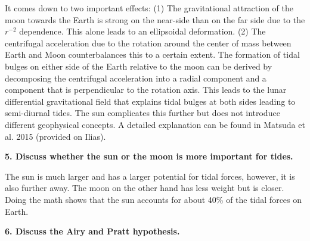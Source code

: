 \documentclass[a4paper,12pt]{article}
\newif\ifanswers
\begin{document}
    \begin{tcolorbox}[enhanced jigsaw,breakable,pad at break*=1mm,
      colback=blue!5!white,colframe=babyblueeyes,title=Solutions]
    It comes down to two important effects: (1) The gravitational attraction of the moon towards the Earth is strong on the near-side than on the far side due to the $r^{-2}$ dependence. This alone leads to an ellipsoidal deformation. (2) The centrifugal acceleration due to the rotation around the center of mass between Earth and Moon counterbalances this to a certain extent. The formation of tidal bulges on either side of the Earth relative to the moon can be derived by decomposing the centrifugal acceleration into a radial component and a component that is perpendicular to the rotation axis. This leads to the lunar differential gravitational field that explains tidal bulges at both sides leading to semi-diurnal tides. The sun complicates this further but does not introduce different geophysical concepts. A detailed explanation can be found in Matsuda et al. 2015 (provided on Ilias).
    \end{tcolorbox}
    \textbf{5. Discuss whether the sun or the moon is more important for tides.}
    \ifanswers
      \begin{tcolorbox}[enhanced jigsaw,breakable,pad at break*=1mm,
        colback=blue!5!white,colframe=babyblueeyes,title=Solutions]
        The sun is much larger and has a larger potential for tidal forces, however, it is also further away. The moon on the other hand has less weight but is closer. Doing the math shows that the sun accounts for about 40\% of the tidal forces on Earth.
      \end{tcolorbox}
      \textbf{6. Discuss the Airy and Pratt hypothesis. }
\end{document}
